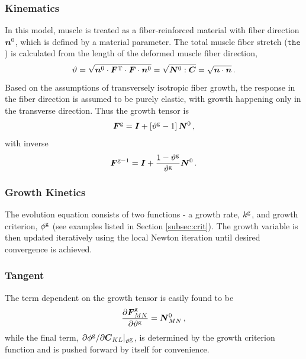 \documentclass[10pt,letterpaper,oneside]{report}
\newcommand{\ten}[1]{\mbox{\boldmath $#1$}{}}
\newcommand{\scas}[1]{\mbox{{\scriptsize{${\rm{#1}}$}}}{}}
\begin{document}
\begin{itemize}
\subsubsection{Kinematics}
In this model, muscle is treated as a fiber-reinforced material with fiber direction $\ten{n}^0$, which is defined by a material parameter.  The total muscle fiber stretch ($\mathtt{the}$) is calculated from the length of the deformed muscle fiber direction, 
\begin{equation}
\vartheta = \sqrt{ \ten{n}^0 \cdot \ten{F}^{\scas{T}} \cdot \ten{F} \cdot \ten{n}^0} = \sqrt{ \ten{N}^0 : \ten{C} } = \sqrt{ \ten{n} \cdot \ten{n}} \, . 
\label{fiber_stretch}
\end{equation}
Based on the assumptions of transversely isotropic fiber growth, the response in the fiber direction is assumed to be purely elastic, with growth happening only in the transverse direction.  Thus the growth tensor is
\begin{equation}
\ten{F}^{\scas{g}} = \ten{I} + \left[ \vartheta^{\scas{g}} - 1 \right] \ten{N}^0 \, , 
\end{equation}
with inverse 
\begin{equation}
\ten{F}^{\scas{g}-1} = \ten{I} + \frac{1 - \vartheta^{\scas{g}}}{\vartheta^{\scas{g}}} \ten{N}^0 \, . 
\end{equation}

\subsubsection{Growth Kinetics}
The evolution equation consists of two functions - a growth rate, $k^{\scas{g}}$, and growth criterion, $\phi^{\scas{g}}$ (see examples listed in Section \ref{subsec:crit}).  The growth variable is then updated iteratively using the local Newton iteration until desired convergence is achieved.

\subsubsection{Tangent}
The term dependent on the growth tensor is easily found to be
\begin{equation}
\frac{\partial \ten{F}^{\scas{g}}_{MN} }{\partial \vartheta^{\scas{g}}} = \ten{N}^0_{MN}  \, ,
\end{equation}
while the final term, $ \left. \partial \phi^{\scas{g}} / \partial \ten{C}_{KL} \right|_{\vartheta^{\scas{g}}} $, is determined by the growth criterion function and is pushed forward by itself for convenience.  


\end{itemize}
\end{document}
